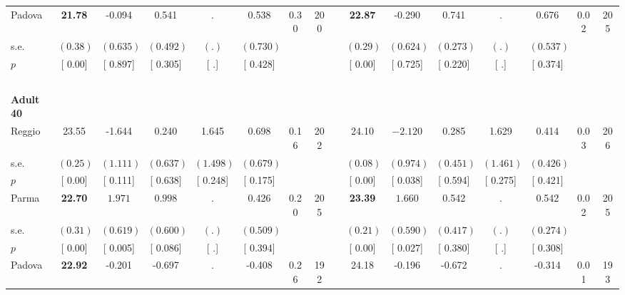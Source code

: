 \begin{longtable}{L{8em} c c c c c c c p{1em} c c c c c c c}
\quad \quad \quad Padova& \textbf{    21.78} &    -0.094 &     0.541 &         . &     0.538 &      0.30 &       200 & & \textbf{    22.87} &    -0.290 &     0.741 &         . &     0.676 &      0.02 &       205  \\*
\quad \quad \quad \quad s.e.& $ (     0.38)$ & $ (    0.635)$ & $ (    0.492)$ & $ (        .)$ & $ (    0.730)$ & & & & $ (     0.29)$ & $ (    0.624)$ & $ (    0.273)$ & $ (        .)$ & $ (    0.537)$ & &  \\*
\quad \quad \quad \quad $ p$ & [     0.00] & [    0.897] & [    0.305] & [        .] & [    0.428] & & & & [     0.00] & [    0.725] & [    0.220] & [        .] & [    0.374] & &  \\[1em]
~\\[1em]
\quad \quad \textbf{Adult 40} & & & & & & & & & & & & & & & \\* 
\quad \quad \quad Reggio& 23.55 &    -1.644 &     0.240 &     1.645 &     0.698 &      0.16 &       202 & & 24.10 & $ \mathbf{   -2.120}$ &     0.285 &     1.629 &     0.414 &      0.03 &       206  \\*
\quad \quad \quad \quad s.e.& $ (     0.25)$ & $ (    1.111)$ & $ (    0.637)$ & $ (    1.498)$ & $ (    0.679)$ & & & & $ (     0.08)$ & $ (    0.974)$ & $ (    0.451)$ & $ (    1.461)$ & $ (    0.426)$ & &  \\*
\quad \quad \quad \quad $ p$ & [     0.00] & [    0.111] & [    0.638] & [    0.248] & [    0.175] & & & & [     0.00] & [    0.038] & [    0.594] & [    0.275] & [    0.421] & &  \\[1em]
\quad \quad \quad Parma& \textbf{    22.70} & $ \mathbf{    1.971}$ & $ \mathbf{    0.998}$ &         . &     0.426 &      0.20 &       205 & & \textbf{    23.39} & $ \mathbf{    1.660}$ &     0.542 &         . &     0.542 &      0.02 &       205  \\*
\quad \quad \quad \quad s.e.& $ (     0.31)$ & $ (    0.619)$ & $ (    0.600)$ & $ (        .)$ & $ (    0.509)$ & & & & $ (     0.21)$ & $ (    0.590)$ & $ (    0.417)$ & $ (        .)$ & $ (    0.274)$ & &  \\*
\quad \quad \quad \quad $ p$ & [     0.00] & [    0.005] & [    0.086] & [        .] & [    0.394] & & & & [     0.00] & [    0.027] & [    0.380] & [        .] & [    0.308] & &  \\[1em]
\quad \quad \quad Padova& \textbf{    22.92} &    -0.201 &    -0.697 &         . &    -0.408 &      0.26 &       192 & & 24.18 &    -0.196 &    -0.672 &         . &    -0.314 &      0.01 &       193  \\*

\end{longtable}
